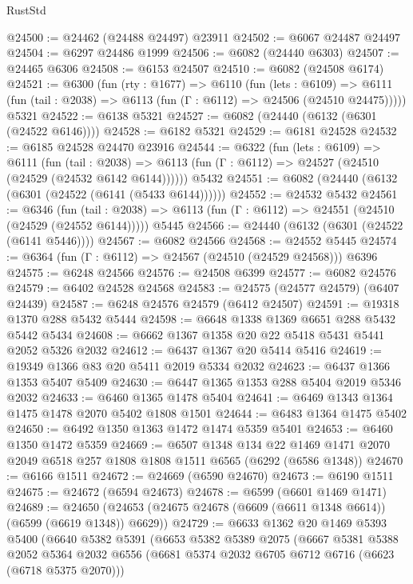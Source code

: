 \begin{lexlean}{RustStd}
\begin{coremodule}
@24500 := @24462 (@24488 @24497) @23911
@24502 := @6067 @24487 @24497
@24504 := @6297 @24486 @1999
@24506 := @6082 (@24440 @6303)
@24507 := @24465 @6306
@24508 := @6153 @24507
@24510 := @6082 (@24508 @6174)
@24521 := @6300
    (fun (rty : @1677) =>
    @6110
      (fun (lets : @6109) =>
      @6111 (fun (tail : @2038) => @6113 (fun (Γ : @6112) => @24506 (@24510 @24475)))))
    @5321
@24522 := @6138 @5321
@24527 := @6082 (@24440 (@6132 (@6301 (@24522 @6146))))
@24528 := @6182 @5321
@24529 := @6181 @24528
@24532 := @6185 @24528 @24470 @23916
@24544 := @6322
    (fun (lets : @6109) =>
    @6111
      (fun (tail : @2038) =>
      @6113 (fun (Γ : @6112) => @24527 (@24510 (@24529 (@24532 @6142 @6144))))))
    @5432
@24551 := @6082 (@24440 (@6132 (@6301 (@24522 (@6141 (@5433 @6144))))))
@24552 := @24532 @5432
@24561 := @6346
    (fun (tail : @2038) => @6113 (fun (Γ : @6112) => @24551 (@24510 (@24529 (@24552 @6144)))))
    @5445
@24566 := @24440 (@6132 (@6301 (@24522 (@6141 @5446))))
@24567 := @6082 @24566
@24568 := @24552 @5445
@24574 := @6364 (fun (Γ : @6112) => @24567 (@24510 (@24529 @24568))) @6396
@24575 := @6248 @24566
@24576 := @24508 @6399
@24577 := @6082 @24576
@24579 := @6402 @24528 @24568
@24583 := @24575 (@24577 @24579) (@6407 @24439)
@24587 := @6248 @24576 @24579 (@6412 @24507)
@24591 := @19318 @1370 @288 @5432 @5444
@24598 := @6648 @1338 @1369 @6651 @288 @5432 @5442 @5434
@24608 := @6662 @1367 @1358 @20 @22 @5418 @5431 @5441 @2052 @5326 @2032
@24612 := @6437 @1367 @20 @5414 @5416
@24619 := @19349 @1366 @83 @20 @5411 @2019 @5334 @2032
@24623 := @6437 @1366 @1353 @5407 @5409
@24630 := @6447 @1365 @1353 @288 @5404 @2019 @5346 @2032
@24633 := @6460 @1365 @1478 @5404
@24641 := @6469 @1343 @1364 @1475 @1478 @2070 @5402 @1808 @1501
@24644 := @6483 @1364 @1475 @5402
@24650 := @6492 @1350 @1363 @1472 @1474 @5359 @5401
@24653 := @6460 @1350 @1472 @5359
@24669 := @6507
    @1348
    @134
    @22
    @1469
    @1471
    @2070
    @2049
    @6518
    @257
    @1808
    @1808
    @1511
    @6565
    (@6292 (@6586 @1348))
@24670 := @6166 @1511
@24672 := @24669 (@6590 @24670)
@24673 := @6190 @1511
@24675 := @24672 (@6594 @24673)
@24678 := @6599 (@6601 @1469 @1471)
@24689 := @24650 (@24653 (@24675 @24678 (@6609 (@6611 @1348 @6614)) (@6599 (@6619 @1348)) @6629))
@24729 := @6633
    @1362
    @20
    @1469
    @5393
    @5400
    (@6640
      @5382
      @5391
      (@6653
        @5382
        @5389
        @2075
        (@6667
          @5381
          @5388
          @2052
          @5364
          @2032
          @6556
          (@6681 @5374 @2032 @6705 @6712 @6716 (@6623 (@6718 @5375 @2070)))

\end{coremodule}
\end{lexlean}
